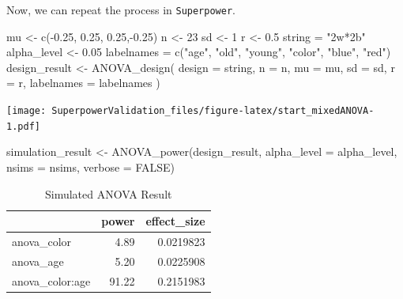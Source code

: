 \documentclass[
]{book}
\newenvironment{Shaded}{\begin{snugshade}}{\end{snugshade}}
\newcommand{\AttributeTok}[1]{\textcolor[rgb]{0.77,0.63,0.00}{#1}}
\newcommand{\ConstantTok}[1]{\textcolor[rgb]{0.00,0.00,0.00}{#1}}
\newcommand{\DecValTok}[1]{\textcolor[rgb]{0.00,0.00,0.81}{#1}}
\newcommand{\FloatTok}[1]{\textcolor[rgb]{0.00,0.00,0.81}{#1}}
\newcommand{\FunctionTok}[1]{\textcolor[rgb]{0.00,0.00,0.00}{#1}}
\newcommand{\NormalTok}[1]{#1}
\newcommand{\OtherTok}[1]{\textcolor[rgb]{0.56,0.35,0.01}{#1}}
\newcommand{\SpecialCharTok}[1]{\textcolor[rgb]{0.00,0.00,0.00}{#1}}
\newcommand{\StringTok}[1]{\textcolor[rgb]{0.31,0.60,0.02}{#1}}
\begin{document}
Now, we can repeat the process in \texttt{Superpower}.

\begin{Shaded}
\begin{Highlighting}[]
\NormalTok{mu }\OtherTok{\textless{}{-}} \FunctionTok{c}\NormalTok{(}\SpecialCharTok{{-}}\FloatTok{0.25}\NormalTok{, }\FloatTok{0.25}\NormalTok{, }\FloatTok{0.25}\NormalTok{,}\SpecialCharTok{{-}}\FloatTok{0.25}\NormalTok{)}
\NormalTok{n }\OtherTok{\textless{}{-}} \DecValTok{23}
\NormalTok{sd }\OtherTok{\textless{}{-}} \DecValTok{1}
\NormalTok{r }\OtherTok{\textless{}{-}} \FloatTok{0.5}
\NormalTok{string }\OtherTok{=} \StringTok{"2w*2b"}
\NormalTok{alpha\_level }\OtherTok{\textless{}{-}} \FloatTok{0.05}
\NormalTok{labelnames }\OtherTok{=} \FunctionTok{c}\NormalTok{(}\StringTok{"age"}\NormalTok{, }\StringTok{"old"}\NormalTok{, }\StringTok{"young"}\NormalTok{, }\StringTok{"color"}\NormalTok{, }\StringTok{"blue"}\NormalTok{, }\StringTok{"red"}\NormalTok{)}
\NormalTok{design\_result }\OtherTok{\textless{}{-}} \FunctionTok{ANOVA\_design}\NormalTok{(}
\AttributeTok{design =}\NormalTok{ string,}
\AttributeTok{n =}\NormalTok{ n,}
\AttributeTok{mu =}\NormalTok{ mu,}
\AttributeTok{sd =}\NormalTok{ sd,}
\AttributeTok{r =}\NormalTok{ r,}
\AttributeTok{labelnames =}\NormalTok{ labelnames}
\NormalTok{)}
\end{Highlighting}
\end{Shaded}

\texttt{[image: SuperpowerValidation\_files/figure-latex/start\_mixedANOVA-1.pdf]}

\begin{Shaded}
\begin{Highlighting}[]
\NormalTok{simulation\_result }\OtherTok{\textless{}{-}} \FunctionTok{ANOVA\_power}\NormalTok{(design\_result, }
                                 \AttributeTok{alpha\_level =}\NormalTok{ alpha\_level, }
                                 \AttributeTok{nsims =}\NormalTok{ nsims,}
                                 \AttributeTok{verbose =} \ConstantTok{FALSE}\NormalTok{)}
\end{Highlighting}
\end{Shaded}

\begin{table}[!h]

\caption{\label{tab:unnamed-chunk-152}Simulated ANOVA Result}
\centering
\begin{tabular}[t]{l|r|r}
\hline
  & power & effect\_size\\
\hline
anova\_color & 4.89 & 0.0219823\\
\hline
anova\_age & 5.20 & 0.0225908\\
\hline
anova\_color:age & 91.22 & 0.2151983\\
\hline
\end{tabular}
\end{table}
\end{document}
